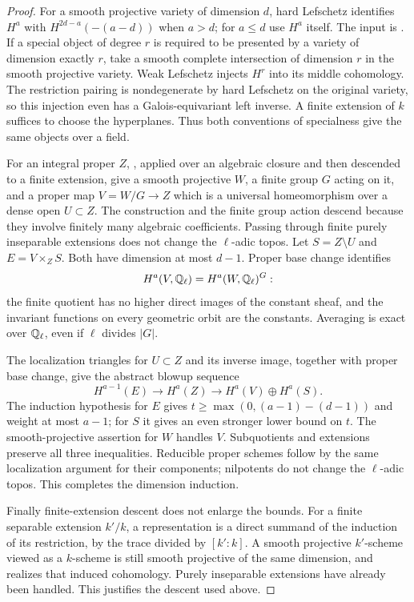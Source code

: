 \begin{proof}
For a smooth projective variety of dimension $d$, hard Lefschetz identifies $H^a$ with $H^{2d-a}(-(a-d))$ when $a>d$; for $a\leq d$ use $H^a$ itself. The input is \citet[Theorem 4.1.1]{c_deligneweil1980}. If a special object of degree $r$ is required to be presented by a variety of dimension exactly $r$, take a smooth complete intersection of dimension $r$ in the smooth projective variety. Weak Lefschetz injects $H^r$ into its middle cohomology. The restriction pairing is nondegenerate by hard Lefschetz on the original variety, so this injection even has a Galois-equivariant left inverse. A finite extension of $k$ suffices to choose the hyperplanes. Thus both conventions of specialness give the same objects over a field.

For an integral proper $Z$, \citet[Theorem 7.3 and Corollary 7.4]{c_dejong1996}, applied over an algebraic closure and then descended to a finite extension, give a smooth projective $W$, a finite group $G$ acting on it, and a proper map $V=W/G\to Z$ which is a universal homeomorphism over a dense open $U\subset Z$. The construction and the finite group action descend because they involve finitely many algebraic coefficients. Passing through finite purely inseparable extensions does not change the \(\ell\)-adic topos. Let $S=Z\setminus U$ and $E=V\times_ZS$. Both have dimension at most $d-1$. Proper base change identifies
\[
 H^a(V,\mathbb Q_\ell)=H^a(W,\mathbb Q_\ell)^G:
\]
the finite quotient has no higher direct images of the constant sheaf, and the invariant functions on every geometric orbit are the constants. Averaging is exact over $\mathbb Q_\ell$, even if $\ell$ divides $|G|$.

The localization triangles for $U\subset Z$ and its inverse image, together with proper base change, give the abstract blowup sequence
\[
 H^{a-1}(E)\longrightarrow H^a(Z)
 \longrightarrow H^a(V)\oplus H^a(S).
\]
The induction hypothesis for $E$ gives $t\geq\max(0,(a-1)-(d-1))$ and weight at most $a-1$; for $S$ it gives an even stronger lower bound on $t$. The smooth-projective assertion for $W$ handles $V$. Subquotients and extensions preserve all three inequalities. Reducible proper schemes follow by the same localization argument for their components; nilpotents do not change the \(\ell\)-adic topos. This completes the dimension induction.

Finally finite-extension descent does not enlarge the bounds. For a finite separable extension $k'/k$, a representation is a direct summand of the induction of its restriction, by the trace divided by $[k':k]$. A smooth projective $k'$-scheme viewed as a $k$-scheme is still smooth projective of the same dimension, and realizes that induced cohomology. Purely inseparable extensions have already been handled. This justifies the descent used above.
\end{proof}

